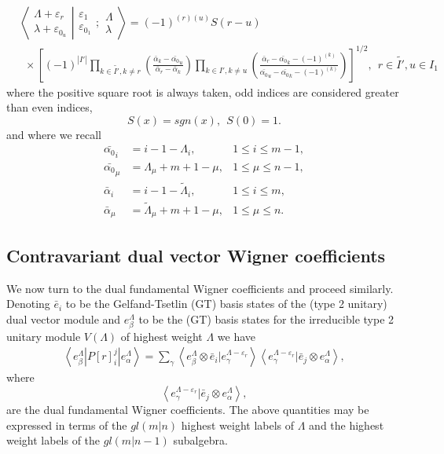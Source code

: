 \documentclass[12pt]{article}
\def\nn{\nonumber}
\begin{document}
\begin{align}
& \left\langle\left. 
\begin{array}{c} \Lambda+\varepsilon_r\\ \lambda+\varepsilon_{0_u} 
 \end{array}
\right|\right.
\left.
\begin{array}{c} \varepsilon_1 \\ \varepsilon_{0_1} 
 \end{array}
; \begin{array}{c} \Lambda \\ \lambda
 \end{array}
\right\rangle = (-1)^{(r)(u)} S(r-u) \nn\\
&~~\times \left[ (-1)^{|I'|} \prod_{k\in \tilde{I'},k\neq r} 
\left(
\frac 
{\bar{\alpha}_k - \bar{\alpha_0}_u  }
{\bar{\alpha}_r - \bar{\alpha}_k }
\right)
\prod_{k\in I',k \neq u} 
\left(
\frac
{ \bar{\alpha}_r - \bar{\alpha_0}_k - (-1)^{(k)} }
{\bar{\alpha_0}_u - \bar{\alpha_0}_k - (-1)^{(k)} }
\right)
\right]^{1/2}
,\ \ r\in \tilde{I'},u\in I_1 \label{FinalBarredOdd}
\end{align}
where the positive square root is always taken, odd indices are considered greater than even indices, 
$$
S(x) = sgn(x),~~S(0)=1.
$$
and where we recall
\begin{align*}
{\bar{\alpha_0}}_i &= i - 1 -\Lambda_i  , &1\leq i\leq m-1, \\
{\bar{\alpha_0}}_\mu &= \Lambda_\mu + m + 1 - \mu  ,  &1\leq \mu \leq n-1 , \\ 
\bar{\alpha}_i  &= i - 1 -{\tilde{\Lambda}}_i , &1\leq i\leq m, \\
\bar{\alpha}_\mu &= {\tilde{\Lambda}}_\mu + m + 1 - \mu,  &1\leq \mu \leq n .  
\end{align*}

\subsection{Contravariant dual vector Wigner coefficients}

We now turn to the dual fundamental Wigner coefficients and proceed similarly. 
Denoting $\bar{e}_i$ to be the Gelfand-Tsetlin (GT) basis states of the (type 2 unitary) dual vector module and ${e^\Lambda_\beta}$ to be the (GT) basis states for the irreducible type 2 unitary module $V(\Lambda)$ of highest weight $\Lambda$ we have 
\begin{align}
\left\langle e^\Lambda_\beta | P[r]^j_i | e^{\Lambda}_\alpha \right\rangle =
\sum_\gamma \left\langle e^\Lambda_\beta \otimes \bar{e}_i | e^{\Lambda - \varepsilon_r}_\gamma \right\rangle
\left\langle e^{\Lambda-\varepsilon_r}_\gamma | \bar{e}_j \otimes e^\Lambda_\alpha \right\rangle, \label{Pij}
\end{align}
where
$$
\left\langle e^{\Lambda-\varepsilon_r}_\gamma | \bar{e}_j \otimes e^\Lambda_\alpha \right\rangle,
$$
are the dual fundamental Wigner coefficients. The above quantities may be expressed in terms of the $gl(m|n)$ highest weight labels of $\Lambda$ and the highest weight labels of the $gl(m|n-1)$ subalgebra.
\end{document}
